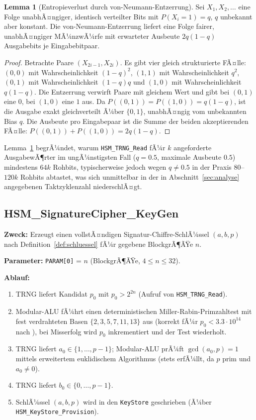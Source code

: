﻿\documentclass[a4paper,12pt]{article}
\theoremstyle{definition}
\newtheorem{lemma}{Lemma}
\begin{document}
\begin{lemma}[Entropieverlust durch von-Neumann-Entzerrung]
	\label{lem:vonneumann}
	Sei $X_1, X_2, \ldots$ eine Folge unabhÃ¤ngiger, identisch verteilter Bits mit $P(X_i=1)=q$, $q$ unbekannt aber konstant. Die von-Neumann-Entzerrung liefert eine Folge fairer, unabhÃ¤ngiger MÃ¼nzwÃ¼rfe mit erwarteter Ausbeute $2q(1-q)$ Ausgabebits je Eingabebitpaar.
\end{lemma}

\begin{proof}
	Betrachte Paare $(X_{2i-1}, X_{2i})$. Es gibt vier gleich strukturierte FÃ¤lle: $(0,0)$ mit Wahrscheinlichkeit $(1-q)^2$, $(1,1)$ mit Wahrscheinlichkeit $q^2$, $(0,1)$ mit Wahrscheinlichkeit $(1-q)q$ und $(1,0)$ mit Wahrscheinlichkeit $q(1-q)$. Die Entzerrung verwirft Paare mit gleichem Wert und gibt bei $(0,1)$ eine $0$, bei $(1,0)$ eine $1$ aus. Da $P((0,1)) = P((1,0)) = q(1-q)$, ist die Ausgabe exakt gleichverteilt Ã¼ber $\{0,1\}$, unabhÃ¤ngig vom unbekannten Bias $q$. Die Ausbeute pro Eingabepaar ist die Summe der beiden akzeptierenden FÃ¤lle: $P((0,1)) + P((1,0)) = 2q(1-q)$. \qedhere
\end{proof}

Lemma~\ref{lem:vonneumann} begrÃ¼ndet, warum \texttt{HSM\_TRNG\_Read} fÃ¼r $k$ angeforderte AusgabewÃ¶rter im ungÃ¼nstigsten Fall ($q=0.5$, maximale Ausbeute $0.5$) mindestens $64k$ Rohbits, typischerweise jedoch wegen $q \ne 0.5$ in der Praxis $80$--$120k$ Rohbits abtastet, was sich unmittelbar in der in Abschnitt~\ref{sec:analyse} angegebenen Taktzyklenzahl niederschlÃ¤gt.

\subsection{HSM\_SignatureCipher\_KeyGen}

\textbf{Zweck:} Erzeugt einen vollstÃ¤ndigen Signatur-Chiffre-SchlÃ¼ssel $(a,b,p)$ nach Definition~\ref{def:schluessel} fÃ¼r gegebene BlockgrÃ¶ÃŸe $n$.

\textbf{Parameter:} \texttt{PARAM[0]} = $n$ (BlockgrÃ¶ÃŸe, $4 \le n \le 32$).

\textbf{Ablauf:}
\begin{enumerate}
	\item TRNG liefert Kandidat $p_0$ mit $p_0 > 2^{2n}$ (Aufruf von \texttt{HSM\_TRNG\_Read}).
	\item Modular-ALU fÃ¼hrt einen deterministischen Miller-Rabin-Primzahltest mit fest verdrahteten Basen $\{2,3,5,7,11,13\}$ aus (korrekt fÃ¼r $p_0 < 3.3 \cdot 10^{14}$ nach \cite{Pom05}), bei Misserfolg wird $p_0$ inkrementiert und der Test wiederholt.
	\item TRNG liefert $a_0 \in \{1,\ldots,p-1\}$; Modular-ALU prÃ¼ft $\gcd(a_0,p)=1$ mittels erweitertem euklidischem Algorithmus (stets erfÃ¼llt, da $p$ prim und $a_0 \ne 0$).
	\item TRNG liefert $b_0 \in \{0,\ldots,p-1\}$.
	\item SchlÃ¼ssel $(a,b,p)$ wird in den \texttt{KeyStore} geschrieben (Ã¼ber \texttt{HSM\_KeyStore\_Provision}).
\end{enumerate}
\end{document}

